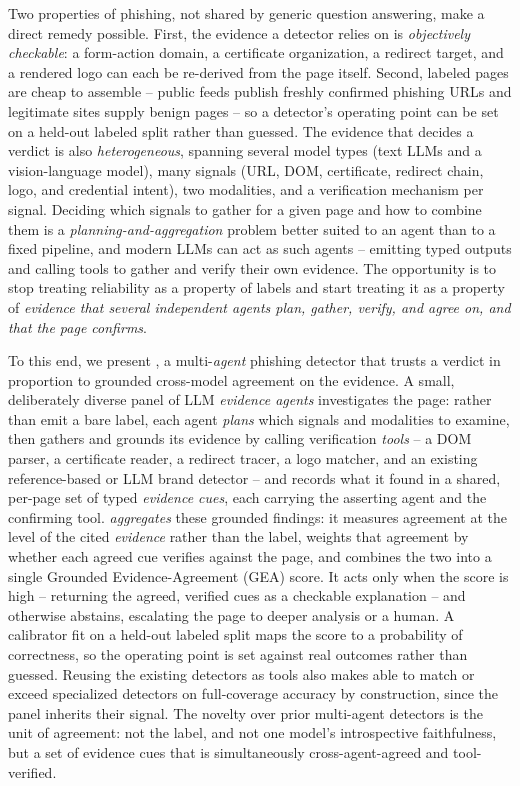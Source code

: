 Two properties of phishing, not shared by generic question answering, make a
direct remedy possible. First, the evidence a detector relies on is
\emph{objectively checkable}: a form-action domain, a certificate organization, a
redirect target, and a rendered logo can each be re-derived from the page itself.
Second, labeled pages are cheap to assemble -- public feeds publish freshly
confirmed phishing URLs and legitimate sites supply benign pages -- so a detector's
operating point can be set on a held-out labeled split rather than guessed. The evidence that decides a verdict is also
\emph{heterogeneous}, spanning several model types (text LLMs and a
vision-language model), many signals (URL, DOM, certificate, redirect chain, logo,
and credential intent), two modalities, and a verification mechanism per signal.
Deciding which signals to gather for a given page and how to combine them is a
\emph{planning-and-aggregation} problem better suited to an agent than to a fixed
pipeline, and modern LLMs can act as such agents -- emitting typed outputs and
calling tools to gather and verify their own evidence. The opportunity is to stop
treating reliability as a property of labels and start treating it as a property of
\emph{evidence that several independent agents plan, gather, verify, and agree on,
and that the page confirms}.

To this end, we present \toolname, a multi-\emph{agent} phishing detector that
trusts a verdict in proportion to grounded cross-model agreement on the evidence.
A small, deliberately diverse panel of LLM \emph{evidence agents} investigates the
page: rather than emit a bare label, each agent \emph{plans} which signals and
modalities to examine, then gathers and grounds its evidence by calling
verification \emph{tools} -- a DOM parser, a certificate reader, a redirect tracer,
a logo matcher, and an existing reference-based or LLM brand detector -- and records
what it found in a shared, per-page set of typed \emph{evidence cues}, each carrying
the asserting agent and the confirming tool. \toolname{} \emph{aggregates} these
grounded findings: it measures agreement at the level of the cited \emph{evidence}
rather than the label, weights that agreement by whether each agreed cue verifies
against the page, and combines the two into a single Grounded Evidence-Agreement (GEA)
score. It acts only when the score is high -- returning the agreed, verified cues as
a checkable explanation -- and otherwise abstains, escalating the page to deeper
analysis or a human. A calibrator fit on a held-out labeled split maps the score to
a probability of correctness, so the operating point is set against real outcomes
rather than guessed. Reusing the existing detectors as tools also makes \toolname{}
able to match or exceed specialized detectors on full-coverage accuracy by construction,
since the panel inherits their signal. The novelty over prior multi-agent detectors is the unit of
agreement: not the label, and not one model's introspective faithfulness, but a set
of evidence cues that is simultaneously cross-agent-agreed and tool-verified.

